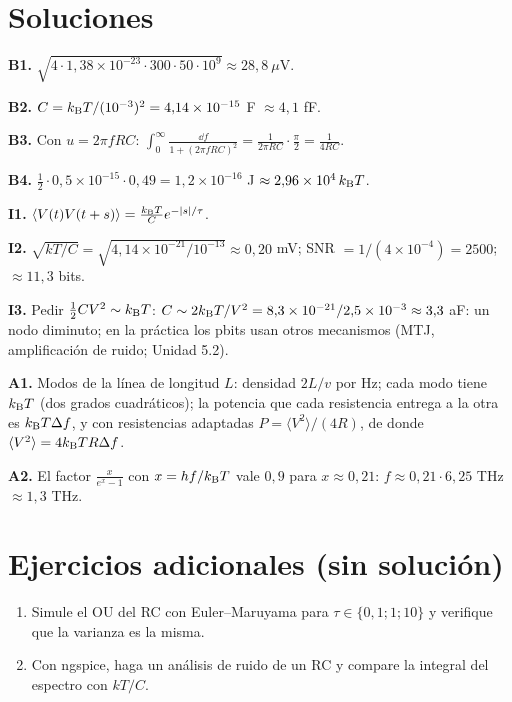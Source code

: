 \documentclass[11pt,a4paper]{article}
\begin{document}
\section{Soluciones}
\begin{solucion}
\textbf{B1.} $\sqrt{4\cdot1{,}38\times10^{-23}\cdot300\cdot50\cdot10^9}\approx28{,}8\ \mu$V.

\textbf{B2.} $C=k_{\mathrm B} T/(10^{-3})^2=4{,}14\times10^{-15}$ F $\approx4{,}1$ fF.

\textbf{B3.} Con $u=2\pi fRC$: $\int_0^\infty\frac{\dd f}{1+(2\pi fRC)^2}=\frac{1}{2\pi RC}\cdot\frac\pi2=\frac1{4RC}$.

\textbf{B4.} $\frac12\cdot0{,}5\times10^{-15}\cdot0{,}49=1{,}2\times10^{-16}$ J $\approx2{,}96\times10^4\,k_{\mathrm B} T$.

\textbf{I1.} $\langle V(t)V(t+s)\rangle=\frac{k_{\mathrm B} T}{C}e^{-|s|/\tau}$.

\textbf{I2.} $\sqrt{kT/C}=\sqrt{4{,}14\times10^{-21}/10^{-13}}\approx0{,}20$ mV; SNR $=1/(4\times10^{-4})=2500$; $\approx11{,}3$ bits.

\textbf{I3.} Pedir $\frac12CV^2\sim k_{\mathrm B} T$: $C\sim2k_{\mathrm B} T/V^2=8{,}3\times10^{-21}/2{,}5\times10^{-3}\approx3{,}3$ aF: un nodo diminuto; en la práctica los pbits usan otros mecanismos (MTJ, amplificación de ruido; Unidad 5.2).

\textbf{A1.} Modos de la línea de longitud $L$: densidad $2L/v$ por Hz; cada modo tiene $k_{\mathrm B} T$ (dos grados cuadráticos); la potencia que cada resistencia entrega a la otra es $k_{\mathrm B} T\Delta f$, y con resistencias adaptadas $P=\langle V^2\rangle/(4R)$, de donde $\langle V^2\rangle=4k_{\mathrm B} TR\Delta f$.

\textbf{A2.} El factor $\frac{x}{e^x-1}$ con $x=hf/k_{\mathrm B} T$ vale $0{,}9$ para $x\approx0{,}21$: $f\approx0{,}21\cdot6{,}25$ THz $\approx1{,}3$ THz.
\end{solucion}

\section{Ejercicios adicionales (sin solución)}
\begin{enumerate}[label=\textbf{P\arabic*.}]
\item Simule el OU del RC con Euler--Maruyama para $\tau\in\{0{,}1;1;10\}$ y verifique que la varianza es la misma.
\item Con ngspice, haga un análisis de ruido de un RC y compare la integral del espectro con $kT/C$.
\end{enumerate}
\end{document}
